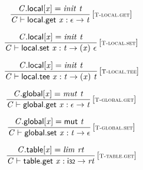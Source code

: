$$
\begin{array}{@{}c@{}}\displaystyle
\frac{
{\mathit{C}}.\mathsf{local}[{\mathit{x}}] = {\mathit{init}}~{\mathit{t}}
}{
{\mathit{C}} \vdash \mathsf{local.get}~{\mathit{x}} : \epsilon \rightarrow {\mathit{t}}
} \, {[\textsc{\scriptsize T{-}local.get}]}
\qquad
\end{array}
$$

$$
\begin{array}{@{}c@{}}\displaystyle
\frac{
{\mathit{C}}.\mathsf{local}[{\mathit{x}}] = {\mathit{init}}~{\mathit{t}}
}{
{\mathit{C}} \vdash \mathsf{local.set}~{\mathit{x}} : {\mathit{t}} \rightarrow ({\mathit{x}})~\epsilon
} \, {[\textsc{\scriptsize T{-}local.set}]}
\qquad
\end{array}
$$

$$
\begin{array}{@{}c@{}}\displaystyle
\frac{
{\mathit{C}}.\mathsf{local}[{\mathit{x}}] = {\mathit{init}}~{\mathit{t}}
}{
{\mathit{C}} \vdash \mathsf{local.tee}~{\mathit{x}} : {\mathit{t}} \rightarrow ({\mathit{x}})~{\mathit{t}}
} \, {[\textsc{\scriptsize T{-}local.tee}]}
\qquad
\end{array}
$$

\vspace{1ex}

$$
\begin{array}{@{}c@{}}\displaystyle
\frac{
{\mathit{C}}.\mathsf{global}[{\mathit{x}}] = {\mathit{mut}}~{\mathit{t}}
}{
{\mathit{C}} \vdash \mathsf{global.get}~{\mathit{x}} : \epsilon \rightarrow {\mathit{t}}
} \, {[\textsc{\scriptsize T{-}global.get}]}
\qquad
\end{array}
$$

$$
\begin{array}{@{}c@{}}\displaystyle
\frac{
{\mathit{C}}.\mathsf{global}[{\mathit{x}}] = \mathsf{mut}~{\mathit{t}}
}{
{\mathit{C}} \vdash \mathsf{global.set}~{\mathit{x}} : {\mathit{t}} \rightarrow \epsilon
} \, {[\textsc{\scriptsize T{-}global.set}]}
\qquad
\end{array}
$$

\vspace{1ex}

$$
\begin{array}{@{}c@{}}\displaystyle
\frac{
{\mathit{C}}.\mathsf{table}[{\mathit{x}}] = {\mathit{lim}}~{\mathit{rt}}
}{
{\mathit{C}} \vdash \mathsf{table.get}~{\mathit{x}} : \mathsf{i{\scriptstyle32}} \rightarrow {\mathit{rt}}
} \, {[\textsc{\scriptsize T{-}table.get}]}
\qquad
\end{array}
$$

